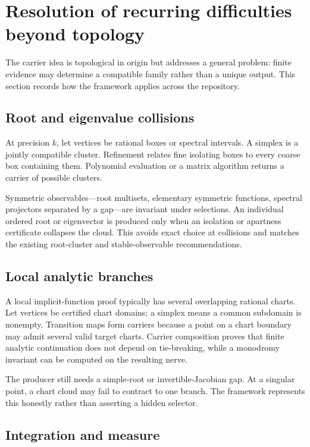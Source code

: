
\section{Resolution of recurring difficulties beyond topology}
\label{sec:cross-domain}

The carrier idea is topological in origin but addresses a general problem: finite evidence may determine a compatible family rather than a unique output.  This section records how the framework applies across the repository.

\subsection{Root and eigenvalue collisions}

At precision $k$, let vertices be rational boxes or spectral intervals.  A simplex is a jointly compatible cluster.  Refinement relates fine isolating boxes to every coarse box containing them.  Polynomial evaluation or a matrix algorithm returns a carrier of possible clusters.

Symmetric observables---root multisets, elementary symmetric functions, spectral projectors separated by a gap---are invariant under selections.  An individual ordered root or eigenvector is produced only when an isolation or apartness certificate collapses the cloud.  This avoids exact choice at collisions and matches the existing root-cluster and stable-observable recommendations.

\subsection{Local analytic branches}

A local implicit-function proof typically has several overlapping rational charts.  Let vertices be certified chart domains; a simplex means a common subdomain is nonempty.  Transition maps form carriers because a point on a chart boundary may admit several valid target charts.  Carrier composition proves that finite analytic continuation does not depend on tie-breaking, while a monodromy invariant can be computed on the resulting nerve.

The producer still needs a simple-root or invertible-Jacobian gap.  At a singular point, a chart cloud may fail to contract to one branch.  The framework represents this honestly rather than asserting a hidden selector.

\subsection{Integration and measure}

